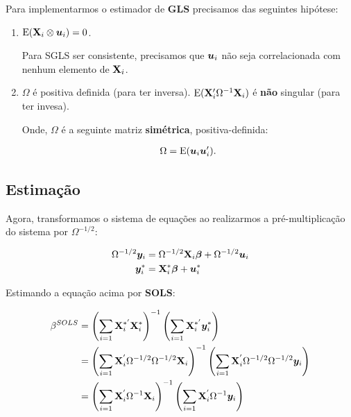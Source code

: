 \documentclass[11pt, oneside, a4paper, article]{article}
\numberwithin{equation}{section}
\begin{document}
\begin{description}
Para implementarmos o estimador de \textbf{GLS} precisamos das seguintes hipótese:

\begin{enumerate}
\item %

			$\text{E}(\mathbf{X}_{i} \otimes \boldsymbol{u}_{i}) = 0$.

			Para SGLS ser consistente, precisamos que $\boldsymbol{u}_{i}$ não seja correlacionada com nenhum elemento de $\mathbf{X}_{i}$.

		\item %

			$\Omega$ é positiva definida (para ter inversa).
			$\text{E}(\mathbf{X}_{i}^{\prime} \Omega^{-1} \mathbf{X}_{i})$ é \textbf{não} singular (para ter invesa).

			Onde, $\Omega$ é a seguinte matriz \textbf{simétrica}, positiva-definida:

			\vspace{-1.5 em}
			\begin{align*}
				\Omega = \text{E}(\boldsymbol{u}_{i} \boldsymbol{u}_{i}^{\prime}).
			\end{align*}
	\end{enumerate}

	\subsection{Estimação}

	Agora, transformamos o sistema de equações ao realizarmos a pré-multiplicação do sistema por $\Omega^{-1/2}$:

	\vspace{-1.5 em}
	\begin{align*}
		\Omega^{-1/2} \boldsymbol{y}_{i} 
		&=
		\Omega^{-1/2} \mathbf{X}_{i} \boldsymbol{\beta}
		+
		\Omega^{-1/2} \boldsymbol{u}_{i}
		\\
		\boldsymbol{y}_{i}^{*}
		&=
		\mathbf{X}_{i}^{*} \boldsymbol{\beta}
		+
		\boldsymbol{u}^{*}_{i}
	\end{align*}

	Estimando a equação acima por \textbf{SOLS}:

	\vspace{-1.5 em}
	\begin{align*}
		\beta^{SOLS}
		&=
		\left( \sum_{i=1} \mathbf{X}_{i}^{*'} \mathbf{X}_{i}^{*} \right)^{-1}
		\left( \sum_{i=1} \mathbf{X}_{i}^{*'} \boldsymbol{y}_{i}^{*} \right)
		\\
		&=
		\left( \sum_{i=1} \mathbf{X}_{i}^{'} \Omega^{-1/2} \Omega^{-1/2} \mathbf{X}_{i} \right)^{-1}
		\left( \sum_{i=1} \mathbf{X}_{i}^{'} \Omega^{-1/2} \Omega^{-1/2} \boldsymbol{y}_{i} \right)
		\\
		&=
		\left( \sum_{i=1} \mathbf{X}_{i}^{'} \Omega^{-1} \mathbf{X}_{i} \right)^{-1}
		\left( \sum_{i=1} \mathbf{X}_{i}^{'} \Omega^{-1} \boldsymbol{y}_{i} \right)
	\end{align*}



\end{description}
\end{document}
